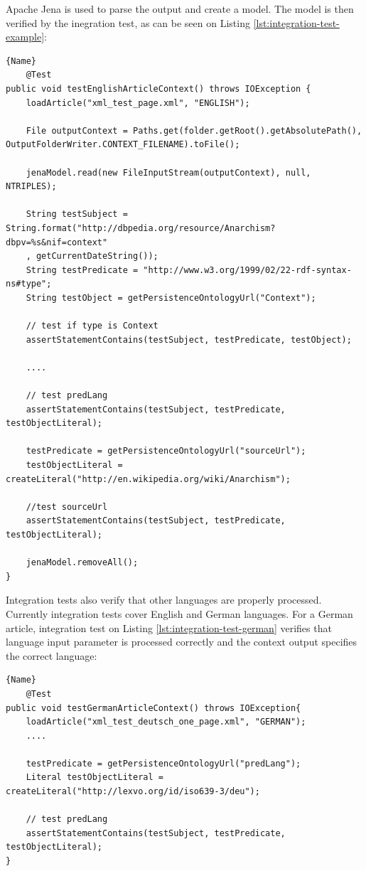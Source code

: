 \documentclass[thesis=M,english,hidelinks]{FITthesis}[2019/12/23]
\begin{document}
Apache Jena is used to parse the output and create a model. The model is then verified by the inegration test, as can be seen on Listing \ref{lst:integration-test-example}:

\begin{lstlisting}[caption=Integration Testing - English Article Context,frame=tlrb,  label = {lst:integration-test-example}]{Name}
    @Test
public void testEnglishArticleContext() throws IOException {
	loadArticle("xml_test_page.xml", "ENGLISH");
	
	File outputContext = Paths.get(folder.getRoot().getAbsolutePath(), OutputFolderWriter.CONTEXT_FILENAME).toFile();
	
	jenaModel.read(new FileInputStream(outputContext), null, NTRIPLES);
	
	String testSubject = String.format("http://dbpedia.org/resource/Anarchism?dbpv=%s&nif=context"
	, getCurrentDateString());
	String testPredicate = "http://www.w3.org/1999/02/22-rdf-syntax-ns#type";
	String testObject = getPersistenceOntologyUrl("Context");
	
	// test if type is Context
	assertStatementContains(testSubject, testPredicate, testObject);
		
	....
	
	// test predLang
	assertStatementContains(testSubject, testPredicate, testObjectLiteral);
	
	testPredicate = getPersistenceOntologyUrl("sourceUrl");
	testObjectLiteral = createLiteral("http://en.wikipedia.org/wiki/Anarchism");
	
	//test sourceUrl
	assertStatementContains(testSubject, testPredicate, testObjectLiteral);
	
	jenaModel.removeAll();
}
\end{lstlisting}

Integration tests also verify that other languages are properly processed. Currently integration tests cover English and German languages. For a German article, integration test on Listing \ref{lst:integration-test-german} verifies that language input parameter is processed correctly and the context output specifies the correct language:

\begin{lstlisting}[caption=Integration Testing - German Article Context,frame=tlrb,  label = {lst:integration-test-german}]{Name}
    @Test
public void testGermanArticleContext() throws IOException{
	loadArticle("xml_test_deutsch_one_page.xml", "GERMAN");
	....
	
	testPredicate = getPersistenceOntologyUrl("predLang");
	Literal testObjectLiteral = createLiteral("http://lexvo.org/id/iso639-3/deu");
	
	// test predLang
	assertStatementContains(testSubject, testPredicate, testObjectLiteral);
}
\end{lstlisting}
\end{document}
